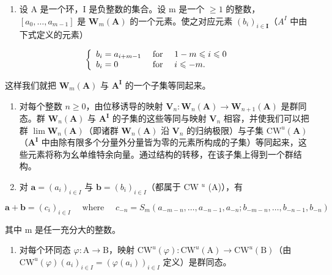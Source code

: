 \begin{enumerate}
\def\labelenumi{\arabic{enumi})}
\setcounter{enumi}{22}
\tightlist
\item
  设 A 是一个环，I 是负整数的集合。设 m 是一个 \(\geqslant 1\) 的整数，\([a_{0}, \ldots, a_{m-1}]\) 是 \(\mathbf{W}_{m}(\mathbf{A})\) 的一个元素。使之对应元素 \((b_{i})_{i\in\mathbf{I}}\)（\(A^{I}\) 中由下式定义的元素）
\end{enumerate}

\[
\left\{ \begin{array}{l l} b _ {i} = a _ {i + m - 1} & \text { for } \quad 1 - m \leqslant i \leqslant 0 \\ b _ {i} = 0 & \text { for } \quad i \leqslant - m. \end{array} \right.
\]

这样我们就把 \(\mathbf{W}_{m}(\mathbf{A})\) 与 \(\mathbf{A}^{\mathbf{I}}\) 的一个子集等同起来。

\begin{enumerate}
\def\labelenumi{\alph{enumi})}
\item
  对每个整数 \(n \geqslant 0\)，由位移诱导的映射 \(\mathbf{V}_n: \mathbf{W}_n(\mathbf{A}) \to \mathbf{W}_{n+1}(\mathbf{A})\) 是群同态。群 \(\mathbf{W}_n(\mathbf{A})\) 与 \(\mathbf{A}^{\mathbf{I}}\) 的子集的这些等同与映射 \(\mathbf{V}_n\) 相容，并使我们可以把群 \(\lim \mathbf{W}_n(\mathbf{A})\)（即诸群 \(\mathbf{W}_n(\mathbf{A})\) 沿 \(\mathbf{V}_n\) 的归纳极限）与子集 \(\mathrm{CW}^u(\mathbf{A})\)（\(\mathbf{A}^{\mathbf{I}}\) 中由除有限多个分量外分量皆为零的元素所构成的子集）等同起来，这些元素将称为幺单维特余向量。通过结构的转移，在该子集上得到一个群结构。
\item
  对 \(\boldsymbol{a} = (a_i)_{i\in I}\) 与 \(\boldsymbol{b} = (b_i)_{i\in I}\)（都属于 CW \(^u\) (A)），有
\end{enumerate}

\[
\boldsymbol {a} + \boldsymbol {b} = (c _ {i}) _ {i \in I} \quad \text { where } \quad c _ {- n} = S _ {m} (a _ {- m - n}, \dots , a _ {- n - 1}, a _ {- n}; b _ {- m - n}, \dots , b _ {- n - 1}, b _ {- n})
\]

其中 m 是任一充分大的整数。

\begin{enumerate}
\def\labelenumi{\alph{enumi})}
\setcounter{enumi}{2}
\tightlist
\item
  对每个环同态 \(\varphi : \mathrm{A} \to \mathrm{B}\)，映射 \(\mathrm{CW}^u(\varphi) : \mathrm{CW}^u(\mathrm{A}) \to \mathrm{CW}^u(\mathrm{B})\)（由 \(\mathrm{CW}^u(\varphi)(a_i)_{i\in I} = (\varphi(a_i))_{i\in I}\) 定义）是群同态。
\end{enumerate}


